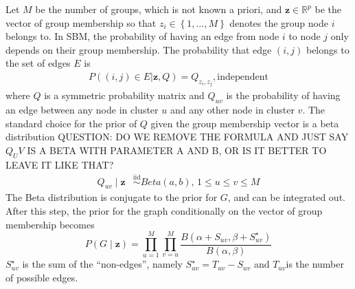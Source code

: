 Let $M$ be the number of groups, which is not known a priori, and $\mathbf{z} \in \mathbb{R}^p$ be the vector of group membership so that $z_i \in \left \{1,\ldots,M \right \}$ denotes the group node $i$ belongs to. In SBM, the probability of having an edge from node $i$ to node $j$ only depends on their group membership. The probability that edge $(i,j)$ belongs to the set of edges $E$ is
\begin{align*}
P((i,j)\in E|\mathbf{z},Q)=Q_{z_i,z_j}, \text{independent}
\end{align*}
where $Q$ is a symmetric probability matrix and $Q_{uv}$ is the probability of having an edge between any node in cluster $u$ and any other node in cluster $v$. The standard choice for the prior of $Q$ given the group membership vector is a beta distribution QUESTION: DO WE REMOVE THE FORMULA AND JUST SAY $Q_UV$ IS A BETA WITH PARAMETER A AND B, OR IS IT BETTER TO LEAVE IT LIKE THAT?
\begin{align*}
    Q_{uv} \mid \mathbf{z} & \overset{\mathrm{iid}}{\sim} Beta(a,b),\, 1\leq u \leq v \leq M
\end{align*}
The Beta distribution is conjugate to the prior for $G$, and can be integrated out. After this step, the prior for the graph conditionally on the vector of group membership becomes
\[
    P(G\mid \mathbf{z})
    =
    \prod_{u=1}^{M}\prod_{v=u}^{M}
    \frac{B(\alpha + S_{uv}, \beta+ S^{\star}_{uv})}{B(\alpha,\beta)}
\]
$S^{\star}_{uv}$ is the sum of the ``non-edges'', namely $S^{\star}_{uv} = T_{uv} - S_{uv}$ and $T_{uv}$is the number of possible edges. \\       

